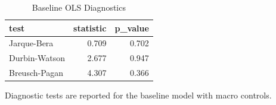 \begin{table}[!htbp]
\centering
\caption{Baseline OLS Diagnostics}
\label{tab:ols_diagnostics}
\begin{threeparttable}

\begin{tabular}{lrr}
\toprule
test & statistic & p\_value\\
\midrule
Jarque-Bera & 0.709 & 0.702\\
Durbin-Watson & 2.677 & 0.947\\
Breusch-Pagan & 4.307 & 0.366\\
\bottomrule
\end{tabular}
\begin{tablenotes}[flushleft]
\footnotesize
\item Diagnostic tests are reported for the baseline model with macro controls.
\end{tablenotes}
\end{threeparttable}
\end{table}
